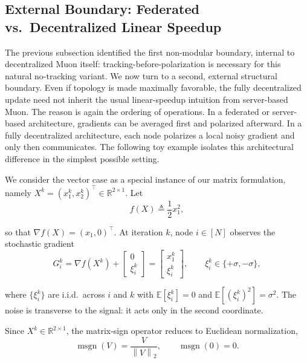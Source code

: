 \documentclass{article}
\newcommand{\E}{\mathbb{E}}
\newcommand{\norm}[1]{\left\|#1\right\|}
\begin{document}
\subsection{External Boundary: Federated vs.\ Decentralized Linear Speedup}
\label{sec:linear-speedup}


The previous subsection identified the first non-modular boundary, internal to
decentralized Muon itself: tracking-before-polarization is necessary for this natural no-tracking variant. We now turn
to a second, external structural boundary. Even if topology is made maximally
favorable, the fully decentralized update need not inherit the usual
linear-speedup intuition from server-based Muon. The reason is again the
ordering of operations. In a federated or server-based architecture, gradients
can be averaged first and polarized afterward. In a fully decentralized
architecture, each node polarizes a local noisy gradient and only then
communicates. The following toy example isolates this architectural difference
in the simplest possible setting.



We consider the vector case as a special instance of our matrix formulation,
namely $X^k=(x_1^k,x_2^k)^\top\in\mathbb{R}^{2\times 1}$. Let
\begin{equation}
\label{eq:speedup-f}
f(X)\triangleq \frac{1}{2}x_1^2,
\end{equation}

so that $\nabla f(X)=(x_1,0)^\top$. At iteration $k$, node $i\in[N]$ observes
the stochastic gradient
\begin{equation}
\label{eq:speedup-stochgrad}
G_i^k
= \nabla f(X^k) + \begin{bmatrix}0\\ \xi_i^k\end{bmatrix}
= \begin{bmatrix}x_1^k\\ \xi_i^k\end{bmatrix},
\qquad
\xi_i^k\in\{+\sigma,-\sigma\},
\end{equation}

where $\{\xi_i^k\}$ are i.i.d.\ across $i$ and $k$ with
$\E[\xi_i^k]=0$ and $\E[(\xi_i^k)^2]=\sigma^2$. The noise is transverse to the
signal: it acts only in the second coordinate.

Since $X^k\in\mathbb{R}^{2\times 1}$, the matrix-sign operator reduces to
Euclidean normalization,
\begin{equation}
\label{eq:speedup-msgn}
\operatorname{msgn}(V)=\frac{V}{\norm{V}_2},
\qquad
\operatorname{msgn}(0)=0.
\end{equation}
\end{document}
